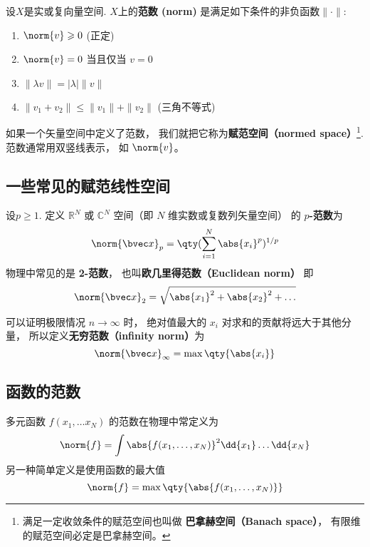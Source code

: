 

设$X$是实或复向量空间. $X$上的\textbf{范数 (norm)} 是满足如下条件的非负函数$\|\cdot\|$:
\begin{enumerate}
\item $\norm{v} \geqslant 0$ (正定)
\item $\norm{v} = 0$ 当且仅当 $v = 0$
\item $\|\lambda v\| = |\lambda|\| v\|$
\item $\|v_1+v_2\| \leqslant \|v_1\|+ \|v_2\|$ (三角不等式)
\end{enumerate}

如果一个矢量空间中定义了范数， 我们就把它称为\textbf{赋范空间（normed space）}\footnote{满足一定收敛条件的赋范空间也叫做 \textbf{巴拿赫空间（Banach space）}， 有限维的赋范空间必定是巴拿赫空间。%
}. 范数通常用双竖线表示， 如 $\norm{v}$。

\subsection{一些常见的赋范线性空间}
设$p\geq1$. 定义 $\mathbb R^N$ 或 $\mathbb C^N$ 空间（即 $N$ 维实数或复数列矢量空间） 的 \textbf{$p$-范数}为
\begin{equation}
\norm{\bvec x}_p = \qty(\sum_{i=1}^N \abs{x_i}^p)^{1/p}
\end{equation}
物理中常见的是 \textbf{2-范数}， 也叫\textbf{欧几里得范数（Euclidean norm）} 即
\begin{equation}
\norm{\bvec x}_2 = \sqrt{\abs{x_1}^2 + \abs{x_2}^2 + \dots}
\end{equation}

可以证明极限情况 $n \to \infty$ 时， 绝对值最大的 $x_i$ 对求和的贡献将远大于其他分量， 所以定义\textbf{无穷范数（infinity norm）}为
\begin{equation}
\norm{\bvec x}_\infty = \max \qty{\abs{x_i}}
\end{equation}

\subsection{函数的范数}
多元函数 $f(x_1, \dots x_N)$ 的范数在物理中常定义为
\begin{equation}
\norm{f} = \int \abs{f(x_1, \dots, x_N)}^2 \dd{x_1}\dots \dd{x_N}
\end{equation}
另一种简单定义是使用函数的最大值
\begin{equation}
\norm{f} = \max\qty{\abs{f(x_1, \dots, x_N)}}
\end{equation}
